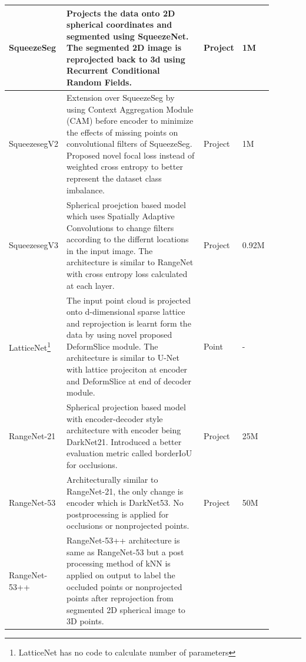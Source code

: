 \begin{longtable}{|p{0.15\linewidth} | p{0.59\linewidth}| p{0.06\linewidth} |p{0.09\linewidth}|}
            \hline
            SqueezeSeg\cite{Sequeseseg_2018} &
            Projects the data onto 2D spherical coordinates and segmented using SqueezeNet.
            The segmented 2D image is reprojected back to 3d using Recurrent Conditional Random Fields.
            & Project & 1M \\
            \hline
            SqueezesegV2\cite{SqueezeSegv2} &
            Extension over SqueezeSeg by using Context Aggregation Module (CAM) before encoder to minimize the effects of missing points on convolutional filters of SqueezeSeg.
            Proposed novel focal loss instead of weighted cross entropy to better represent the dataset class imbalance.
            & Project & 1M \\
            \hline
            SqueezesegV3\cite{xu2020squeezesegv3} &
            Spherical proejction based model which uses Spatially Adaptive Convolutions to change filters according to the differnt locations in the input image.
            The architecture is similar to RangeNet with cross entropy loss calculated at each layer.
            & Project & 0.92M \\
            \hline
            LatticeNet\cite{rosu2019latticenet}\footnote{LatticeNet has no code to calculate number of parameters} &
            The input point cloud is projected onto d-dimensional sparse lattice and reprojection is learnt form the data by using novel proposed DeformSlice module.
            The architecture is similar to U-Net with lattice projeciton at encoder and DeformSlice at end of decoder module.
            & Point & - \\
            \hline
            RangeNet-21\cite{Milioto2019} & 
            Spherical projection based model with encoder-decoder style architecture with encoder being DarkNet21.
            Introduced a better evaluation metric called borderIoU for occlusions.
            & Project & 25M \\
            \hline
            RangeNet-53\cite{Milioto2019}  & 
            Architecturally similar to RangeNet-21, the only change is encoder which is DarkNet53.
            No postprocessing is applied for occlusions or nonprojected points.
            & Project & 50M \\
            \hline
            RangeNet-53++\cite{Milioto2019} &
            RangeNet-53++ architecture is same as RangeNet-53 but a post processing 
            method of kNN is applied on output to label the occluded points or nonprojected points after reprojection from segmented 2D spherical image to 3D points.

\end{longtable}
